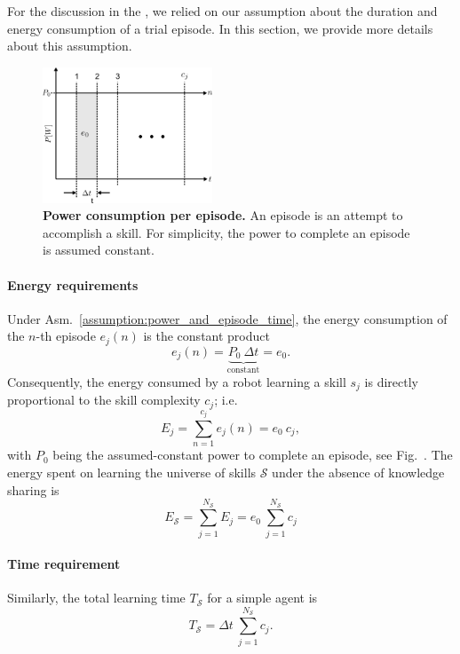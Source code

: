 For the discussion in the , we relied on our assumption about the duration and energy consumption of a trial episode. In this section, we provide more details about this assumption.
\begin{figure}[!h]
    \centering
	\includegraphics[width=0.45\textwidth]{fig/power_per_episode.png}
	\caption{\textbf{Power consumption per episode.} An episode is an attempt to accomplish a skill. For simplicity, the power to complete an episode is assumed constant.}	
	\label{fig:power_per_episode}
\end{figure}
\paragraph{Energy requirements}
Under Asm.~\ref{assumption:power_and_episode_time}, the energy consumption of the $n$-th episode $e_j(n)$ is the constant product
\begin{equation}\label{eq:energy_per_episode}
	e_j(n) = \underbrace{P_0 \: \Delta t}_{\text{constant}} = e_0.
\end{equation}
Consequently, the energy consumed by a robot learning a skill $ s_j $ is directly proportional to the skill complexity $c_j$; i.e.
\begin{equation}\label{eq:energy_per_skill}
	E_j =\sum_{n=1}^{c_j} e_j(n) = e_0\:c_j,
\end{equation}
with $P_0$ being the assumed-constant power to complete an episode, see Fig.~\label{fig:power_per_episode}. The energy spent on learning the universe of skills $\mathcal{S}$ under the absence of knowledge sharing is
\begin{equation}\label{eq:total_energy}
	E_{\mathcal{S}} = \sum_{j=1}^{{N_{\mathcal{S}}}} E_j = e_0 \:\sum_{j=1}^{{N_{\mathcal{S}}}} c_j%
\end{equation}
\paragraph{Time requirement} Similarly, the total learning time $T_{\mathcal{S}}$ for a simple agent is
\begin{equation}\label{eq:total_time}
	T_{\mathcal{S}} = \Delta t \: \sum_{j=1}^{{N_{\mathcal{S}}}} c_j.
\end{equation}

